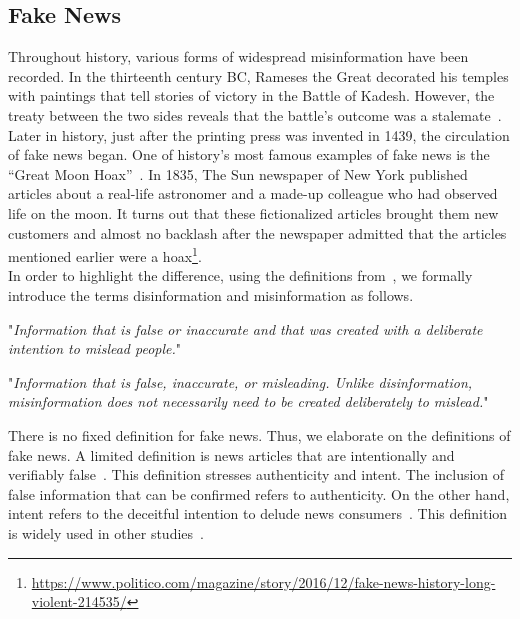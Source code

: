 \subsection{Fake News}
\label{subsec:fakeNewsDetection_fakeNews}
Throughout history, various forms of widespread misinformation have been recorded. In the thirteenth
century BC, Rameses the Great decorated his temples with paintings that tell stories of victory in the Battle
of Kadesh. However, the treaty between the two sides reveals that the battle's outcome was a stalemate~\parencite{HistorysGreatestLies_Weir}. Later in history, just after the printing press was invented in 1439, the circulation of fake news began. One of history's most famous examples of fake news is the “Great Moon Hoax”~\parencite{TheGreatMoonHoax_Foster}. In 1835, The Sun newspaper of New York published articles about a real-life astronomer and a made-up colleague who had observed life on the moon. It turns out that these fictionalized articles brought them new customers and almost no backlash after the newspaper admitted that the articles mentioned earlier were a hoax\footnote{\url{https://www.politico.com/magazine/story/2016/12/fake-news-history-long-violent-214535/}}.\\
In order to highlight the difference, using the definitions from~\parencite{ThePsycologyOfFakeNews_Pennycook}, we formally introduce the terms disinformation and misinformation as follows.
\begin{definition}
    "\emph{Information that is false or inaccurate and that was created with a deliberate intention to mislead people.}"~\parencite{ThePsycologyOfFakeNews_Pennycook}
\end{definition}
\begin{definition}
    "\emph{Information that is false, inaccurate, or misleading. Unlike disinformation, misinformation does not necessarily need to be created deliberately to mislead.}"~\parencite{ThePsycologyOfFakeNews_Pennycook}
\end{definition}
There is no fixed definition for fake news. Thus, we elaborate on the definitions of fake news. A limited definition is news articles that are intentionally and verifiably false~\parencite{SocialMediaAndFakeNewsIn2016Election_Allcott}. This definition stresses authenticity and intent. The inclusion of false information that can be confirmed refers to authenticity. On the other hand, intent refers to the deceitful intention to delude news consumers~\parencite{FakeNewsDetectionOnSocialMediaADataMiningPerspective_Shu}. This definition is widely used in other studies~\parencite{AutomaticDeceptionDetection_Conroy, TheFakeNewsSpreadingPlague_Mustafaraj, FakeNewsDetectionOnSocialMediaADataMiningPerspective_Shu}.\\
